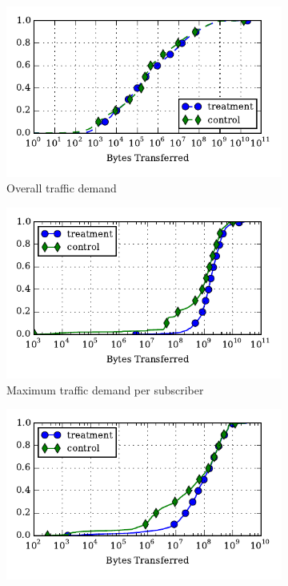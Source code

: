 \begin{figure}[t]
\begin{minipage}{1\linewidth}
\centering
%
\begin{subfigure}[b]{0.33\linewidth}
\includegraphics[width=\linewidth]{figures/cdf-all-bytes.pdf}
               \caption{Overall traffic demand\label{fig:CDF-data-rate}}
\end{subfigure}
%
\begin{subfigure}[b]{0.33\linewidth}
\includegraphics[width=\linewidth]{figures/cdf-per-device-max.pdf}
               \caption{Maximum traffic demand 
per subscriber\label{fig:CDF-data-rate-max}}
\end{subfigure}
%
\begin{subfigure}[b]{0.33\linewidth}
\includegraphics[width=\linewidth]{figures/cdf-per-device-perc95.pdf}

\end{subfigure}
\end{minipage}
\end{figure}
